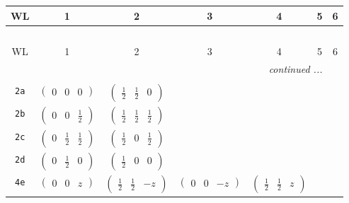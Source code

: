 \documentclass[fleqn,9pt,landscape]{jsarticle}
\begin{document}
\begin{center}
\renewcommand{\arraystretch}{1.2}
\begin{longtable}{ccccccc}
 \hline \hline
WL & 1 & 2 & 3 & 4 & 5 & 6 \\ \hline \endfirsthead

\multicolumn{6}{l}{\tablename\ \thetable{}} \\
 \hline \hline
WL & 1 & 2 & 3 & 4 & 5 & 6 \\ \hline \endhead

 \hline \hline
\multicolumn{6}{r}{\footnotesize\it continued ...} \\ \endfoot

 \hline \hline
\multicolumn{6}{r}{} \\ \endlastfoot

{\tt 2a} & $ \begin{pmatrix} 0 & 0 & 0 \end{pmatrix} $ & $ \begin{pmatrix} \frac{1}{2} & \frac{1}{2} & 0 \end{pmatrix} $ & $  $ & $  $ & $  $ & $  $ \\ \hline
{\tt 2b} & $ \begin{pmatrix} 0 & 0 & \frac{1}{2} \end{pmatrix} $ & $ \begin{pmatrix} \frac{1}{2} & \frac{1}{2} & \frac{1}{2} \end{pmatrix} $ & $  $ & $  $ & $  $ & $  $ \\ \hline
{\tt 2c} & $ \begin{pmatrix} 0 & \frac{1}{2} & \frac{1}{2} \end{pmatrix} $ & $ \begin{pmatrix} \frac{1}{2} & 0 & \frac{1}{2} \end{pmatrix} $ & $  $ & $  $ & $  $ & $  $ \\ \hline
{\tt 2d} & $ \begin{pmatrix} 0 & \frac{1}{2} & 0 \end{pmatrix} $ & $ \begin{pmatrix} \frac{1}{2} & 0 & 0 \end{pmatrix} $ & $  $ & $  $ & $  $ & $  $ \\ \hline
{\tt 4e} & $ \begin{pmatrix} 0 & 0 & z \end{pmatrix} $ & $ \begin{pmatrix} \frac{1}{2} & \frac{1}{2} & - z \end{pmatrix} $ & $ \begin{pmatrix} 0 & 0 & - z \end{pmatrix} $ & $ \begin{pmatrix} \frac{1}{2} & \frac{1}{2} & z \end{pmatrix} $ & $  $ & $  $ \\ \hline

\end{longtable}
\end{center}
\end{document}
